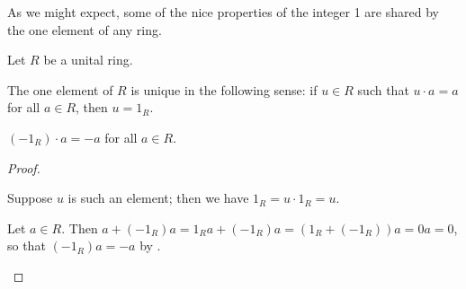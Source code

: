 As we might expect, some of the nice properties of the integer 1 are shared by the one element of any ring.

\begin{prop}
Let \(R\) be a unital ring.
\begin{proplist}
\item The one element of \(R\) is unique in the following sense: if \(u \in R\) such that \(u \cdot a = a\) for all \(a \in R\), then \(u = 1_R\).
\item \((-1_R) \cdot a = -a\) for all \(a \in R\).
\end{proplist}
\end{prop}

\begin{proof}
\begin{inlineproplist}
\item Suppose \(u\) is such an element; then we have \(1_R = u \cdot 1_R = u\).
\item Let \(a \in R\). Then \(a + (-1_R)a = 1_R a + (-1_R)a = (1_R + (-1_R))a = 0a = 0\), so that \((-1_R)a = -a\) by .
\end{inlineproplist}
\end{proof}

